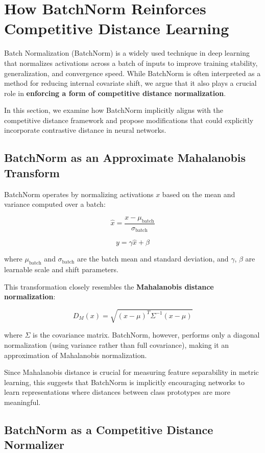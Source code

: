 \section{How BatchNorm Reinforces Competitive Distance Learning}

Batch Normalization (BatchNorm) is a widely used technique in deep learning that normalizes activations across a batch of inputs to improve training stability, generalization, and convergence speed. While BatchNorm is often interpreted as a method for reducing internal covariate shift, we argue that it also plays a crucial role in \textbf{enforcing a form of competitive distance normalization}. 

In this section, we examine how BatchNorm implicitly aligns with the competitive distance framework and propose modifications that could explicitly incorporate contrastive distance in neural networks.

\subsection{BatchNorm as an Approximate Mahalanobis Transform}

BatchNorm operates by normalizing activations \( x \) based on the mean and variance computed over a batch:

\[
\hat{x} = \frac{x - \mu_{\text{batch}}}{\sigma_{\text{batch}}}
\]

\[
y = \gamma \hat{x} + \beta
\]

where \( \mu_{\text{batch}} \) and \( \sigma_{\text{batch}} \) are the batch mean and standard deviation, and \( \gamma \), \( \beta \) are learnable scale and shift parameters.

This transformation closely resembles the \textbf{Mahalanobis distance normalization}:

\[
D_M(x) = \sqrt{(x - \mu)^T \Sigma^{-1} (x - \mu)}
\]

where \( \Sigma \) is the covariance matrix. BatchNorm, however, performs only a diagonal normalization (using variance rather than full covariance), making it an approximation of Mahalanobis normalization. 

Since Mahalanobis distance is crucial for measuring feature separability in metric learning, this suggests that BatchNorm is implicitly encouraging networks to learn representations where distances between class prototypes are more meaningful.

\subsection{BatchNorm as a Competitive Distance Normalizer}


